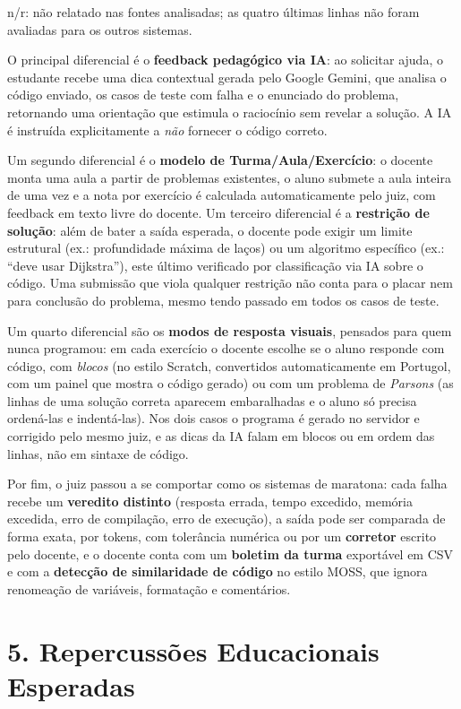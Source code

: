 \documentclass[12pt]{article}
\begin{document}
{\small n/r: não relatado nas fontes analisadas; as quatro últimas linhas não
foram avaliadas para os outros sistemas.}

\vspace{0.5em}
O principal diferencial é o \textbf{feedback pedagógico via IA}: ao solicitar
ajuda, o estudante recebe uma dica contextual gerada pelo Google Gemini, que
analisa o código enviado, os casos de teste com falha e o enunciado do problema,
retornando uma orientação que estimula o raciocínio sem revelar a solução. A IA
é instruída explicitamente a \emph{não} fornecer o código correto.

Um segundo diferencial é o \textbf{modelo de Turma/Aula/Exercício}: o docente
monta uma aula a partir de problemas existentes, o aluno submete a aula
inteira de uma vez e a nota por exercício é calculada automaticamente pelo
juiz, com feedback em texto livre do docente. Um terceiro diferencial é a
\textbf{restrição de solução}: além de bater a saída esperada, o docente pode
exigir um limite estrutural (ex.: profundidade máxima de laços) ou um
algoritmo específico (ex.: ``deve usar Dijkstra''), este último verificado por
classificação via IA sobre o código. Uma submissão que viola qualquer
restrição não conta para o placar nem para conclusão do problema, mesmo tendo
passado em todos os casos de teste.

Um quarto diferencial são os \textbf{modos de resposta visuais}, pensados para
quem nunca programou: em cada exercício o docente escolhe se o aluno responde
com código, com \emph{blocos} (no estilo Scratch, convertidos automaticamente
em Portugol, com um painel que mostra o código gerado) ou com um problema de
\emph{Parsons} (as linhas de uma solução correta aparecem embaralhadas e o
aluno só precisa ordená-las e indentá-las). Nos dois casos o programa é gerado
no servidor e corrigido pelo mesmo juiz, e as dicas da IA falam em blocos ou
em ordem das linhas, não em sintaxe de código.

Por fim, o juiz passou a se comportar como os sistemas de maratona: cada falha
recebe um \textbf{veredito distinto} (resposta errada, tempo excedido, memória
excedida, erro de compilação, erro de execução), a saída pode ser comparada de
forma exata, por tokens, com tolerância numérica ou por um \textbf{corretor}
escrito pelo docente, e o docente conta com um \textbf{boletim da turma}
exportável em CSV e com a \textbf{detecção de similaridade de código} no estilo
MOSS, que ignora renomeação de variáveis, formatação e comentários.

\section*{5. Repercussões Educacionais Esperadas}
\end{document}
